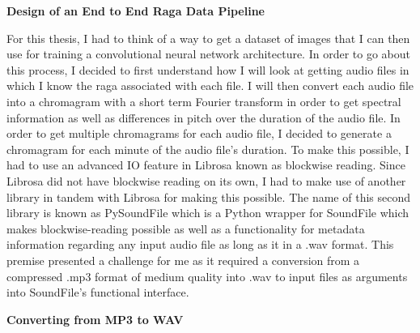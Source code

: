 \doublespacing
\setlength{\parindent}{1cm}

\begin{flushleft}
  \textbf{Design of an End to End Raga Data Pipeline}
\end{flushleft}

For this thesis, I had to think of a way to get a dataset of images that I can then use for training a convolutional neural network architecture. In order to go about this process, I decided to first understand how I will look at getting audio files in which I know the raga associated with each file. I will then convert each audio file into a chromagram with a short term Fourier transform in order to get spectral information as well as differences in pitch over the duration of the audio file. In order to get multiple chromagrams for each audio file, I decided to generate a chromagram for each minute of the audio file's duration. To make this possible, I had to use an advanced I\/O feature in Librosa known as blockwise reading. Since Librosa did not have blockwise reading on its own, I had to make use of another library in tandem with Librosa for making this possible. The name of this second library is known as PySoundFile which is a Python wrapper for SoundFile which makes blockwise-reading possible as well as a functionality for metadata information regarding any input audio file as long as it in a .wav format. This premise presented a challenge for me as it required a conversion from a compressed .mp3 format of medium quality into .wav to input files as arguments into SoundFile's functional interface.

\begin{flushleft}
  \textbf{Converting from MP3 to WAV}
\end{flushleft}
